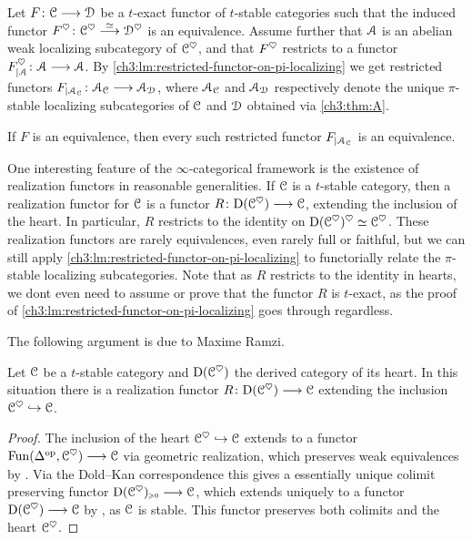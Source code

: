 Let $F\colon\EuScript{C}\longrightarrow\EuScript{D}$ be a $t$-exact functor of $t$-stable categories such that the induced functor $F^\heartsuit \colon \EuScript{C}^\heartsuit\overset{\simeq}{\longrightarrow} \EuScript{D}^\heartsuit$ is an equivalence. Assume further that $\EuScript{A}$ is an abelian weak localizing subcategory of $\EuScript{C}^\heartsuit$, and that $F^\heartsuit$ restricts to a functor $F^\heartsuit_{\vert \EuScript{A}}\colon\EuScript{A}\longrightarrow\EuScript{A}$. By \cref{ch3:lm:restricted-functor-on-pi-localizing} we get restricted functors $F_{\vert \EuScript{A}_{\EuScript{C}}}\colon \EuScript{A}_{\EuScript{C}} \longrightarrow \EuScript{A}_{\EuScript{D}}$, where $\EuScript{A}_{\EuScript{C}}$ and $\EuScript{A}_{\EuScript{D}}$ respectively denote the unique $\pi$-stable localizing subcategories of $\EuScript{C}$ and $\EuScript{D}$ obtained via \cref{ch3:thm:A}.

\begin{corollary}
    If $F$ is an equivalence, then every such restricted functor $F_{\vert \EuScript{A}_{\EuScript{C}}}$ is an equivalence. 
\end{corollary}

One interesting feature of the $\infty$-categorical framework is the existence of realization functors in reasonable generalities. If $\EuScript{C}$ is a $t$-stable category, then a realization functor for $\EuScript{C}$ is a functor $R\colon\mathrm{D}(\EuScript{C}^{\heartsuit})\longrightarrow \EuScript{C}$, extending the inclusion of the heart. In particular, $R$ restricts to the identity on $\mathrm{D}(\EuScript{C}^\heartsuit)^\heartsuit\simeq \EuScript{C}^\heartsuit$. These realization functors are rarely equivalences, even rarely full or faithful, but we can still apply \cref{ch3:lm:restricted-functor-on-pi-localizing} to functorially relate the $\pi$-stable localizing subcategories. Note that as $R$ restricts to the identity in hearts, we dont even need to assume or prove that the functor $R$ is $t$-exact, as the proof of \cref{ch3:lm:restricted-functor-on-pi-localizing} goes through regardless.  

The following argument is due to Maxime Ramzi.

\begin{lemma}
    \label{ch3:lm:realization-functor}
    Let $\EuScript{C}$ be a $t$-stable category and $\mathrm{D}(\EuScript{C}^\heartsuit)$ the derived category of its heart. In this situation there is a realization functor $R\colon\mathrm{D}(\EuScript{C}^{\heartsuit})\longrightarrow \EuScript{C}$ extending the inclusion $\EuScript{C}^\heartsuit\hookrightarrow \EuScript{C}$. 
\end{lemma}
\begin{proof}
     The inclusion of the heart $\EuScript{C}^\heartsuit\hookrightarrow \EuScript{C}$ extends to a functor $\operatorname{Fun}(\Delta^{\mathrm{op}}, \EuScript{C}^\heartsuit)\longrightarrow \EuScript{C}$ via geometric realization, which preserves weak equivalences by \cite[1.2.4.4, 1.2.4.5]{Lurie_HA}. Via the Dold--Kan correspondence this gives a essentially unique colimit preserving functor $\mathrm{D}(\EuScript{C}^\heartsuit)_{\hspace{-1pt}\scriptscriptstyle\geqslant 0}\longrightarrow \EuScript{C}$, which extends uniquely to a functor $\mathrm{D}(\EuScript{C}^\heartsuit)\longrightarrow \EuScript{C}$ by \cite[1.4.4.5]{Lurie_HA}, as $\EuScript{C}$ is stable. This functor preserves both colimits and the heart $\EuScript{C}^\heartsuit$. 
\end{proof}

